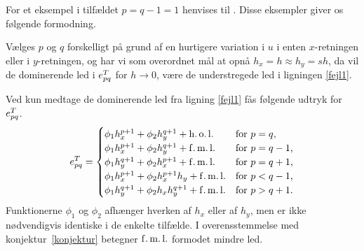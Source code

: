 For et eksempel i tilfældet $p=q-1=1$ henvises til \cite{hugger-pol}. Disse
eksempler giver os følgende formodning.
\begin{conjecture} \label{konjektur}
Vælges $p$ og $q$ forskelligt på grund af en hurtigere variation i $u$
i enten $x$-retningen eller i $y$-retningen, og har vi som overordnet mål
at opnå $h_x = h \approx h_y = sh$, da vil de dominerende led i
$e_{pq}^T$ for $h\rightarrow 0$, være de understregede led i ligningen \eqref{fejl1}.
\end{conjecture}

Ved kun medtage de dominerende led fra ligning \eqref{fejl1} fås følgende
udtryk for $e_{pq}^T$.
\begin{equation} \label{fejl2}
e_{pq}^T =
  \begin{cases}
    \phi_1 h_x^{p+1} + \phi_2 h_y^{q+1} + \operatorname{h.o.l.} &
      \text{for $p=q$,} \\
    \phi_1 h_x^{p+1} + \phi_2 h_y^{q+1} + \operatorname{f.m.l.} &
      \text{for $p=q-1$,} \\
    \phi_1 h_y^{q+1} + \phi_2 h_x^{p+1} + \operatorname{f.m.l.} &
      \text{for $p=q+1$,} \\
    \phi_1 h_x^{p+1} + \phi_2 h_x^{p+1} h_y + \operatorname{f.m.l.} &
      \text{for $p<q-1$,} \\
    \phi_1 h_y^{q+1} + \phi_2 h_x h_y^{q+1} + \operatorname{f.m.l.} &
      \text{for $p>q+1$.} \\
  \end{cases}
\end{equation}
Funktionerne $\phi_1$ og $\phi_2$ afhænger hverken
af $h_x$ eller af $h_y$, men er ikke nødvendigvis identiske i de
enkelte tilfælde. I overensstemmelse med konjektur~\ref{konjektur} betegner
$\operatorname{f.m.l.}$ formodet mindre led.

